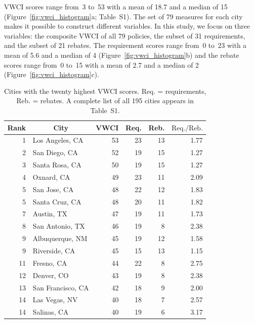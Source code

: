 \documentclass[draft,linenumbers]{agujournal}\usepackage{knitr}
\begin{document}
VWCI scores range from~3
to~53
with a mean of  18.7
and a median of 15
(Figure~\ref{fig:vwci_histogram}a; Table~S1).
The set of 79 measures for each city makes it possible to construct different variables.
In this study, we focus on three variables: the composite VWCI of all 79 policies,
the subset of 31 requirements, and the subset of 21 rebates.
The requirement scores range
from~0
to~23
with a mean of 5.6
and a median of 4
(Figure~\ref{fig:vwci_histogram}b)
and the rebate scores range
from~0
to~15
with a mean of 2.7
and a median of 2
(Figure~\ref{fig:vwci_histogram}c).
%
%
\begin{table}[tbp]
\centering
\caption{Cities with the twenty highest VWCI scores. Req. = requirements, Reb. = rebates. A complete list of all 195 cities appears in Table~S1.} 
\label{tab:top_vwci}
\begin{tabular}{rlrrrr}
  \hline
\multicolumn{1}{c}{ Rank } & \multicolumn{1}{c}{ City } & \multicolumn{1}{c}{ VWCI } & \multicolumn{1}{c}{ Req. } & \multicolumn{1}{c}{ Reb. } & \multicolumn{1}{c}{ $\text{Req.}/\text{Reb.}$ } \\ 
  \hline
  1 & Los Angeles, CA &  53 &  23 &  13 & 1.77 \\ 
    2 & San Diego, CA &  52 &  19 &  15 & 1.27 \\ 
    3 & Santa Rosa, CA &  50 &  19 &  15 & 1.27 \\ 
    4 & Oxnard, CA &  49 &  23 &  11 & 2.09 \\ 
    5 & San Jose, CA &  48 &  22 &  12 & 1.83 \\ 
    5 & Santa Cruz, CA &  48 &  20 &  11 & 1.82 \\ 
    7 & Austin, TX &  47 &  19 &  11 & 1.73 \\ 
    8 & San Antonio, TX &  46 &  19 &   8 & 2.38 \\ 
    9 & Albuquerque, NM &  45 &  19 &  12 & 1.58 \\ 
    9 & Riverside, CA &  45 &  15 &  13 & 1.15 \\ 
   11 & Fresno, CA &  44 &  22 &   8 & 2.75 \\ 
   12 & Denver, CO &  43 &  19 &   8 & 2.38 \\ 
   13 & San Francisco, CA &  42 &  18 &   9 & 2.00 \\ 
   14 & Las Vegas, NV &  40 &  18 &   7 & 2.57 \\ 
   14 & Salinas, CA &  40 &  19 &   6 & 3.17 \\ 

\end{tabular}
\end{table}
\end{document}

